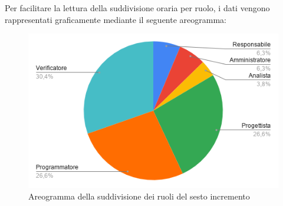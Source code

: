 \documentclass[../piano-di-progetto.tex]{subfiles}
\begin{document}
  Per facilitare la lettura della suddivisione oraria per ruolo, i dati vengono rappresentati graficamente mediante il seguente areogramma:
  \begin{figure}[H]
    \centering
    \includegraphics[width=12cm]{img/ruoli-6-incr.png}
    \caption{Areogramma della suddivisione dei ruoli del sesto incremento}
    \label{fig:ore-ruolo-progettazione}
  \end{figure}
\end{document}
